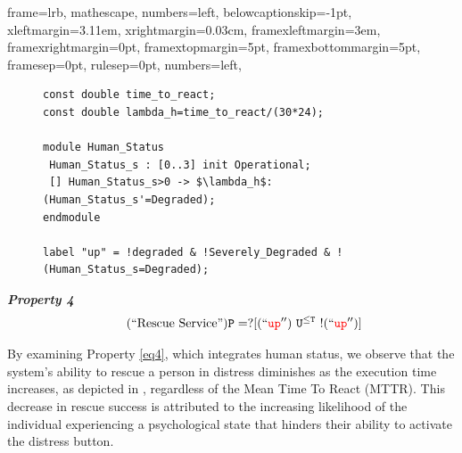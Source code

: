 {
	frame=lrb,
	mathescape,
	numbers=left,
	belowcaptionskip=-1pt,
	xleftmargin=3.11em,
	xrightmargin=0.03cm,
	framexleftmargin=3em,
	framexrightmargin=0pt,
	framextopmargin=5pt,
	framexbottommargin=5pt,
	framesep=0pt,
	rulesep=0pt,
	numbers=left,
}


\begin{figure}[!htb]
\begin{minipage}{12cm}
\begin{lstlisting}[style=framed,
	caption=The Human Status,
 	label=exampleinprism]
const double time_to_react;
const double lambda_h=time_to_react/(30*24);

module Human_Status
 Human_Status_s : [0..3] init Operational;
 [] Human_Status_s>0 -> $\lambda_h$:(Human_Status_s'=Degraded); 
endmodule

label "up" = !degraded & !Severely_Degraded & !(Human_Status_s=Degraded);
\end{lstlisting}
\end{minipage}
\end{figure}

	    \begin{resp}{\textbf{\textit{Property 4}}}
               \begin{equation}
        \label{eq4}\tag{\quot{Rescue Service}}
         \mathtt{ P=? [ (\quot{\textcolor{red}{up} }) \  U^{\leq T} \ !(\quot{\textcolor{red}{up} })  ]} 
        \end{equation}
        \end{resp}
        
        \normalsize

        
By examining Property \ref{eq4}, which integrates human status, we observe that the system's ability to rescue a person in distress diminishes as the execution time increases, as depicted in , regardless of the Mean Time To React (MTTR). This decrease in rescue success is attributed to the increasing likelihood of the individual experiencing a psychological state that hinders their ability to activate the distress button.

